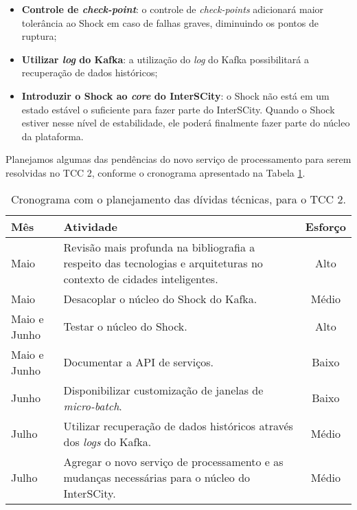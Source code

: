 \begin{itemize}
    \item \textbf{Controle de \textit{check-point}}: o controle de
        \textit{check-points} adicionará maior tolerância ao Shock em caso
        de falhas graves, diminuindo os pontos de ruptura;

    \item \textbf{Utilizar \textit{log} do Kafka}: a utilização do \textit{log}
        do Kafka possibilitará a recuperação de dados históricos;

    \item \textbf{Introduzir o Shock ao \textit{core} do InterSCity}: o Shock
        não está em um estado estável o suficiente para fazer parte do
        InterSCity. Quando o Shock estiver nesse nível de estabilidade, ele
        poderá finalmente fazer parte do núcleo da plataforma.
\end{itemize}

Planejamos algumas das pendências do novo serviço de processamento
para serem resolvidas no TCC 2, conforme o cronograma apresentado na Tabela
\ref{tab:cronograma}.

\begin{table}[h]
  \begin{center}
  \caption{Cronograma com o planejamento das dívidas técnicas, para o TCC 2.}
      \label{tab:cronograma}
    \begin{tabular}{|l| p{12cm}|c|}
        \hline \textbf{Mês} & \textbf{Atividade}  & \textbf{Esforço} \\

        \hline Maio & Revisão mais profunda na bibliografia a respeito das
        tecnologias e arquiteturas no contexto de cidades inteligentes. &
        Alto \\

        \hline Maio & Desacoplar o núcleo do Shock do Kafka. & Médio \\

        \hline Maio e Junho & Testar o núcleo do Shock. & Alto \\

        \hline Maio e Junho & Documentar a API de serviços. & Baixo \\

        \hline Junho & Disponibilizar customização de janelas de \textit{micro-batch}. & Baixo \\

        \hline Julho & Utilizar recuperação de dados históricos através dos
        \textit{logs} do Kafka. & Médio \\

        \hline Julho & Agregar o novo serviço de processamento e as mudanças
        necessárias para o núcleo do InterSCity. & Médio \\

      \hline
    \end{tabular}
  \end{center}
\end{table}


